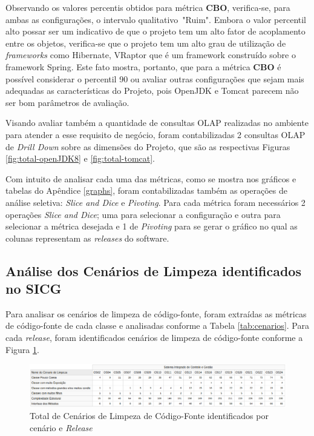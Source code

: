 Observando os valores percentis obtidos para métrica \textbf{CBO}, verifica-se, para ambas as configurações, o intervalo qualitativo~"Ruim". Embora o valor percentil alto possar ser um indicativo de que o projeto tem um alto fator de acoplamento entre os objetos, verifica-se que o projeto tem um alto grau de utilização de \textit{frameworks} como Hibernate, VRaptor que é um framework construído sobre o framework Spring. Este fato mostra, portanto, que para a métrica \textbf{CBO} é possível considerar o percentil 90 ou avaliar outras configurações que sejam mais adequadas as características do Projeto, pois OpenJDK e Tomcat parecem não ser bom parâmetros de avaliação.  


Visando avaliar também a quantidade de consultas OLAP realizadas no ambiente para atender a esse requisito de negócio, foram contabilizadas 2 consultas OLAP de \textit{Drill Down} sobre as dimensões do Projeto, que são as respectivas Figuras \ref{fig:total-openJDK8} e \ref{fig:total-tomcat}. 

Com intuito de analisar cada uma das métricas, como se mostra nos gráficos e tabelas do Apêndice \ref{graphs}, foram contabilizadas também as operações de análise seletiva: \textit{Slice and Dice} e \textit{Pivoting}. Para cada métrica foram necessários 2 operações \textit{Slice and Dice}; uma para selecionar a configuração e outra para selecionar a métrica desejada e 1 de \textit{Pivoting} para se gerar o gráfico no qual as colunas representam as \textit{releases} do software.  
 

\subsection{Análise dos Cenários de Limpeza identificados no SICG}

Para analisar os cenários de limpeza de código-fonte, foram extraídas as métricas de código-fonte de cada classe e analisadas conforme a Tabela \ref{tab:cenarios}. Para cada \textit{release}, foram identificados cenários de limpeza de código-fonte conforme a Figura \ref{fig:cenarios-release}.


\begin{figure}[ht!]
\centering
\includegraphics[keepaspectratio=true,scale=0.47]{figuras/total-cenario-tipo.eps}
\caption{Total de Cenários de Limpeza de Código-Fonte identificados por cenário e \textit{Release}}
\label{fig:cenarios-release}
\end{figure}
\FloatBarrier


